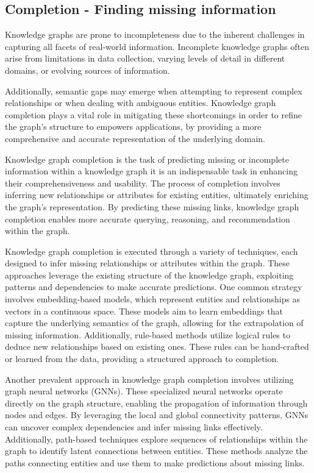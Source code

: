 \subsection{Completion - Finding missing information}

Knowledge graphs are prone to incompleteness due to the inherent challenges in capturing all facets of real-world information. Incomplete knowledge graphs often arise from limitations in data collection, varying levels of detail in different domains, or evolving sources of information. 

Additionally, semantic gaps may emerge when attempting to represent complex relationships or when dealing with ambiguous entities. Knowledge graph completion plays a vital role in mitigating these shortcomings in order to refine the graph's structure to empowers applications, by providing a more comprehensive and accurate representation of the underlying domain.

Knowledge graph completion is the task of predicting missing or incomplete information within a knowledge graph it is an indispensable task in enhancing their comprehensiveness and usability. The process of completion involves inferring new relationships or attributes for existing entities, ultimately enriching the graph's representation. By predicting these missing links, knowledge graph completion enables more accurate querying, reasoning, and recommendation within the graph. 

Knowledge graph completion is executed through a variety of techniques, each designed to infer missing relationships or attributes within the graph. These approaches leverage the existing structure of the knowledge graph, exploiting patterns and dependencies to make accurate predictions. One common strategy involves embedding-based models, which represent entities and relationships as vectors in a continuous space. These models aim to learn embeddings that capture the underlying semantics of the graph, allowing for the extrapolation of missing information. Additionally, rule-based methods utilize logical rules to deduce new relationships based on existing ones. These rules can be hand-crafted or learned from the data, providing a structured approach to completion.

Another prevalent approach in knowledge graph completion involves utilizing graph neural networks (GNNs). These specialized neural networks operate directly on the graph structure, enabling the propagation of information through nodes and edges. By leveraging the local and global connectivity patterns, GNNs can uncover complex dependencies and infer missing links effectively. Additionally, path-based techniques explore sequences of relationships within the graph to identify latent connections between entities. These methods analyze the paths connecting entities and use them to make predictions about missing links.

